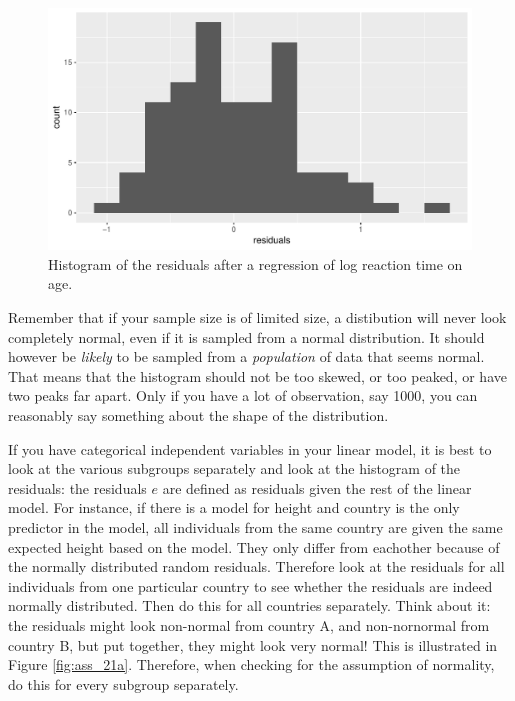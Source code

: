 \documentclass[]{report}\usepackage[]{graphicx}\usepackage[]{color}
\makeatletter
\def\maxwidth{ %
  \ifdim\Gin@nat@width>\linewidth
    \linewidth
  \else
    \Gin@nat@width
  \fi
}
\newenvironment{knitrout}{}{} %
\makeatother
\begin{document}
\begin{knitrout}
\color{fgcolor}\begin{figure}

{\centering \includegraphics[width=\maxwidth]{figure/ass_21-1} 

}

\caption[Histogram of the residuals after a regression of log reaction time on age]{Histogram of the residuals after a regression of log reaction time on age.}\label{fig:ass_21}
\end{figure}


\end{knitrout}

Remember that if your sample size is of limited size, a distibution will never look completely normal, even if it is sampled from a normal distribution. It should however be \textit{likely} to be sampled from a \textit{population} of data that seems normal. That means that the histogram should not be too skewed, or too peaked, or have two peaks far apart. Only if you have a lot of observation, say 1000, you can reasonably say something about the shape of the distribution. 

If you have categorical independent variables in your linear model, it is best to look at the various subgroups separately and look at the histogram of the residuals: the residuals $e$ are defined as residuals given the rest of the linear model. For instance, if there is a model for height and country is the only predictor in the model, all individuals from the same country are given the same expected height based on the model. They only differ from eachother because of the normally distributed random residuals. Therefore look at the residuals for all individuals from one particular country to see whether the residuals are indeed normally distributed. Then do this for all countries separately. Think about it: the residuals might look non-normal from country A, and non-nornormal from country B, but put together, they might look very normal! This is illustrated in Figure \ref{fig:ass_21a}. Therefore, when checking for the assumption of normality, do this for every subgroup separately.  
\end{document}
